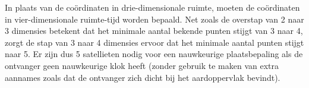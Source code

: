 \begin{Antwoord}{4.15}
		In plaats van de co\"ordinaten in drie-dimensionale ruimte, moeten de co\"ordinaten in vier-dimensionale ruimte-tijd worden bepaald. Net zoals de overstap van 2 naar 3 dimensies betekent dat het minimale aantal bekende punten stijgt van 3 naar 4, zorgt de stap van 3 naar 4 dimensies ervoor dat het minimale aantal punten stijgt naar 5. Er zijn dus 5 satellieten nodig voor een nauwkeurige plaatsbepaling als de ontvanger geen nauwkeurige klok heeft (zonder gebruik te maken van extra aannames zoals dat de ontvanger zich dicht bij het aardoppervlak bevindt).
	
\end{Antwoord}
